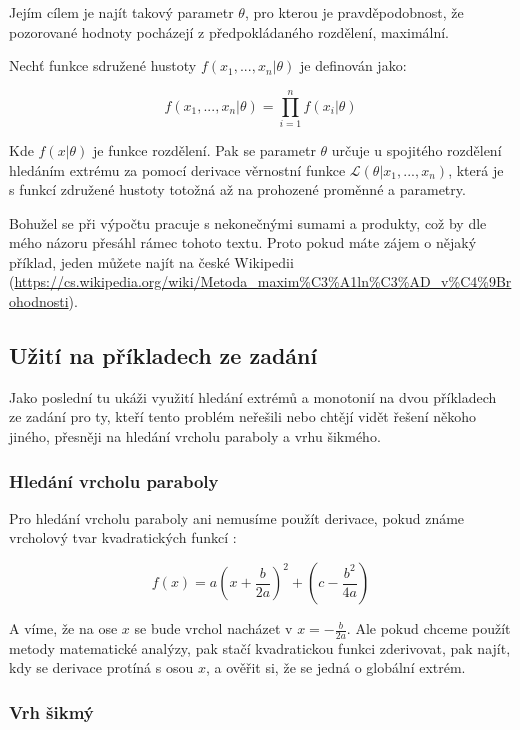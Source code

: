\documentclass{fkssolpub}
\begin{document}
Jejím cílem je najít takový parametr $\theta$, pro
kterou je pravděpodobnost, že pozorované hodnoty pocházejí z předpokládaného
rozdělení, maximální. \cite{noauthor_matematicka_nodate} 
\cite{noauthor_metoda_2022}

Nechť funkce sdružené hustoty $f(x_1, ..., x_n|\theta)$ je definován jako:

\[
  f(x_1, ..., x_n|\theta) = \prod \limits_{i=1}^n f(x_i|\theta)
\]

Kde $f(x|\theta)$ je funkce rozdělení. Pak se parametr $\theta$ určuje u 
spojitého rozdělení hledáním extrému za pomocí derivace věrnostní funkce 
$\mathcal{L}(\theta|x_1, ..., x_n)$, která je s funkcí združené hustoty
totožná až na prohozené proměnné a parametry. \cite{noauthor_matematicka_nodate}
\cite{noauthor_metoda_2022}

Bohužel se při výpočtu pracuje s nekonečnými sumami a produkty, což
by dle mého názoru přesáhl rámec tohoto textu. Proto pokud máte zájem o
nějaký příklad, jeden můžete najít na české Wikipedii 
(\url{https://cs.wikipedia.org/wiki/Metoda_maxim\%C3\%A1ln\%C3\%AD_v\%C4\%9Brohodnosti}).


\subsection{Užití na příkladech ze zadání}

Jako poslední tu ukáži využití hledání extrémů a monotonií na
dvou příkladech ze zadání pro ty, kteří tento problém neřešili nebo chtějí
vidět řešení někoho jiného, přesněji na hledání vrcholu paraboly 
a vrhu šikmého.

\subsubsection{Hledání vrcholu paraboly}

Pro hledání vrcholu paraboly ani nemusíme použít derivace, pokud známe
vrcholový tvar kvadratických funkcí \cite{odvarko_matematika_1994}:

\[
  f(x) = a\left(x + \frac{b}{2a}\right)^2 + \left(c - \frac{b^2}{4a}\right)
\]

A víme, že na ose $x$ se bude vrchol nacházet v $x = -\frac{b}{2a}$. Ale
pokud chceme použít metody matematické analýzy, pak stačí kvadratickou
funkci zderivovat, pak najít, kdy se derivace protíná s osou $x$, a 
ověřit si, že se jedná o globální extrém.

\subsubsection{Vrh šikmý}
\end{document}
